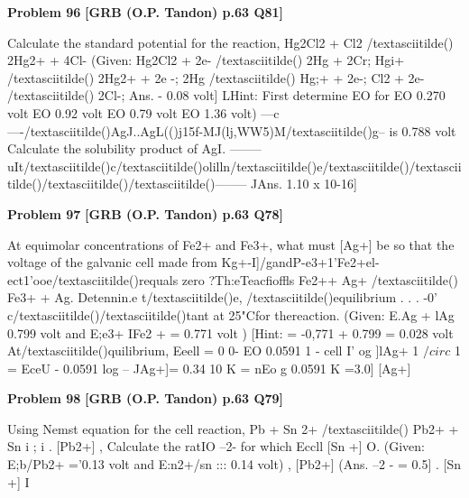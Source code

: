 \begin{problembox}
\textbf{Problem 96} \hfill \textbf{[GRB (O.P. Tandon) p.63 Q81]}
\label{q:ext-grb_all_questions-96}

Calculate the standard potential for the reaction, 
Hg2Cl2 + Cl2 /textasciitilde() 
2Hg2+ + 4Cl-
(Given: 
Hg2Cl2 + 2e- /textasciitilde() 
2Hg + 2Cr; 
Hgi+ /textasciitilde() 
2Hg2+ + 2e -; 
2Hg /textasciitilde() 
Hg;+ + 2e-; 
Cl2 + 2e- /textasciitilde() 
2Cl-; 
Ans. 
- 0.08 volt] 
LHint: 
First determine EO for 
EO 
0.270 volt 
EO 
0.92 volt 
EO 
0.79 volt 
EO 
1.36 volt) 
---c----/textasciitilde()AgJ..AgL(()j15f-MJ(l\underline{\hspace{1cm}}j,WW5)M/textasciitilde()g-- 
is 0.788 volt Calculate the solubility product of AgI. 
--------uIt/textasciitilde()c/textasciitilde()olilln/textasciitilde()e/textasciitilde()/textasciitilde()/textasciitilde()/textasciitilde()--------
JAns. 1.10 x 10-16]
\end{problembox}

\begin{problembox}
\textbf{Problem 97} \hfill \textbf{[GRB (O.P. Tandon) p.63 Q78]}
\label{q:ext-grb_all_questions-97}

At equimolar concentrations of Fe2+ and Fe3+, what must 
[Ag+] be so that the voltage of the galvanic cell made from 
Kg+-I]/gandP-e3+1'Fe2+el-ect1'ooe/textasciitilde()requals zero ?Th:eTeacfioffls 
Fe2++ Ag+ /textasciitilde() 
Fe3+ + Ag. Detennin.e 
t/textasciitilde()e, /textasciitilde()equilibrium 
. 
. 
. 
-0' 
c/textasciitilde()/textasciitilde()tant at 25"Cfor thereaction. (Given: E.Ag + lAg 
0.799 volt 
and E;e3+ IFe2 + = 0.771 volt ) 
[Hint: 
= -0,771 + 0.799 = 0.028 volt 
At/textasciitilde()quilibrium, Eeell = 0 
0- EO \underline{\hspace{1cm}} 0.0591 1 
-
cell 
I' og 
]lAg+ 1 
$/circ$ 
1 
= EceU - 0.0591 log --
JAg+]= 0.34 
10 K = nEo 
g 
0.0591 
K =3.0] 
[Ag+]
\end{problembox}

\begin{problembox}
\textbf{Problem 98} \hfill \textbf{[GRB (O.P. Tandon) p.63 Q79]}
\label{q:ext-grb_all_questions-98}

Using Nemst equation for the cell reaction, 
Pb + Sn 2+ /textasciitilde() 
Pb2+ + Sn 
i 
; 
i 
. 
[Pb2+] 
, 
Calculate the ratIO --2- for which Eccll 
[Sn +] 
O. 
(Given: E;b/Pb2+ ='0.13 volt and E:n2+/sn ::: 
0.14 volt) 
, 
[Pb2+] 
(Ans. 
--2 -
= 0.5] 
. 
[Sn +] 
I
\end{problembox}


